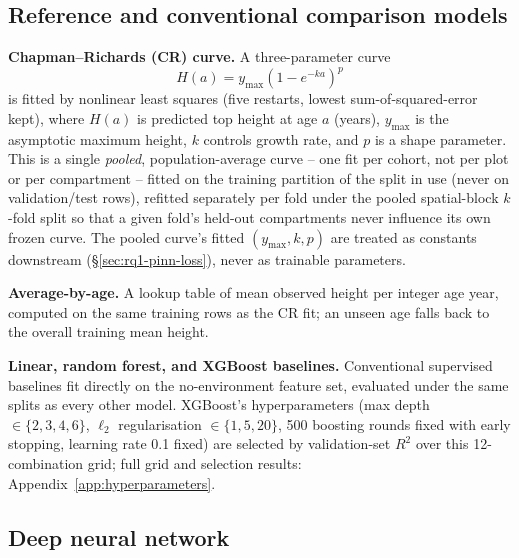 \subsection{Reference and conventional comparison models}
\label{sec:rq1-baselines}

\textbf{Chapman--Richards (CR) curve.} A three-parameter curve
\begin{equation}
H(a) = y_{\max}\left(1-e^{-ka}\right)^{p}
\label{eq:cr}
\end{equation}
is fitted by nonlinear least squares (five restarts, lowest sum-of-squared-error kept), where
$H(a)$ is predicted top height at age $a$ (years), $y_{\max}$ is the asymptotic maximum height,
$k$ controls growth rate, and $p$ is a shape parameter. This is a single \emph{pooled},
population-average curve -- one fit per cohort, not per plot or per compartment -- fitted on the
training partition of the split in use (never on validation/test rows), refitted separately per
fold under the pooled spatial-block $k$-fold split so that a given fold's held-out compartments
never influence its own frozen curve. The pooled curve's fitted $(y_{\max},k,p)$ are treated as
constants downstream (\S\ref{sec:rq1-pinn-loss}), never as trainable parameters.

\textbf{Average-by-age.} A lookup table of mean observed height per integer age year, computed on
the same training rows as the CR fit; an unseen age falls back to the overall training mean
height.

\textbf{Linear, random forest, and XGBoost baselines.} Conventional supervised baselines fit
directly on the no-environment feature set, evaluated under the same splits as every other model.
XGBoost's hyperparameters (max depth $\in\{2,3,4,6\}$, $\ell_2$ regularisation
$\in\{1,5,20\}$, 500 boosting rounds fixed with early stopping, learning rate 0.1 fixed) are
selected by validation-set $R^2$ over this 12-combination grid; full grid and selection results:
Appendix~\ref{app:hyperparameters}.

\subsection{Deep neural network}
\label{sec:rq1-dnn}

